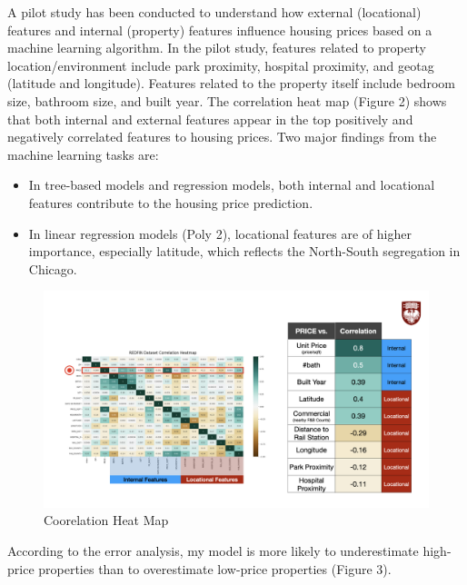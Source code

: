 
A pilot study has been conducted to understand how external (locational) features and internal (property) features influence housing prices based on a machine learning algorithm. In the pilot study, features related to property location/environment include park proximity, hospital proximity, and geotag (latitude and longitude). Features related to the property itself include bedroom size, bathroom size, and built year. The correlation heat map (Figure 2) shows that both internal and external features appear in the top positively and negatively correlated features to housing prices. Two major findings from the machine learning tasks are:

\begin{itemize}
    \item In tree-based models and regression models, both internal and locational features contribute to the housing price prediction.
    \item In linear regression models (Poly 2), locational features are of higher importance, especially latitude, which reflects the North-South segregation in Chicago.
\end{itemize}

\begin{figure}[h]
    \centering
    \includegraphics[width=1\textwidth]{Visual/final_heatmap.jpeg}
    \caption{Coorelation Heat Map}
\end{figure}

According to the error analysis, my model is more likely to underestimate high-price properties than to overestimate low-price properties (Figure 3).

